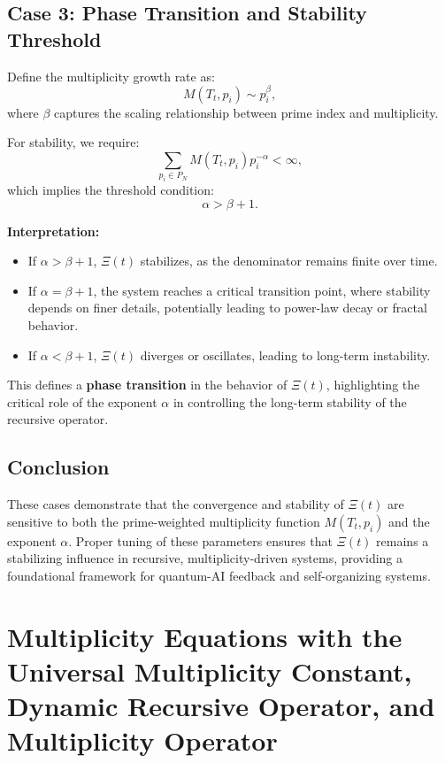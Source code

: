 \documentclass{article}
\theoremstyle{plain}
\begin{document}
\subsection{Case 3: Phase Transition and Stability Threshold}
Define the multiplicity growth rate as:
\begin{equation}
    M(T_t, p_i) \sim p_i^{\beta},
\end{equation}
where \( \beta \) captures the scaling relationship between prime index and multiplicity.

For stability, we require:
\begin{equation}
    \sum_{p_i \in P_N} M(T_t, p_i) p_i^{-\alpha} < \infty,
\end{equation}
which implies the threshold condition:
\begin{equation}
    \alpha > \beta + 1.
\end{equation}

\textbf{Interpretation:}
\begin{itemize}
    \item If \( \alpha > \beta + 1 \), \(\Xi(t) \) stabilizes, as the denominator remains finite over time.
    \item If \( \alpha = \beta + 1 \), the system reaches a critical transition point, where stability depends on finer details, potentially leading to power-law decay or fractal behavior.
    \item If \( \alpha < \beta + 1 \), \(\Xi(t) \) diverges or oscillates, leading to long-term instability.
\end{itemize}
This defines a \textbf{phase transition} in the behavior of \(\Xi(t)\), highlighting the critical role of the exponent \( \alpha \) in controlling the long-term stability of the recursive operator.

\subsection{Conclusion}
These cases demonstrate that the convergence and stability of \(\Xi(t)\) are sensitive to both the prime-weighted multiplicity function \( M(T_t, p_i) \) and the exponent \( \alpha \). Proper tuning of these parameters ensures that \(\Xi(t)\) remains a stabilizing influence in recursive, multiplicity-driven systems, providing a foundational framework for quantum-AI feedback and self-organizing systems.



\section{Multiplicity Equations with the Universal Multiplicity Constant, Dynamic Recursive Operator, and Multiplicity Operator}
\end{document}
